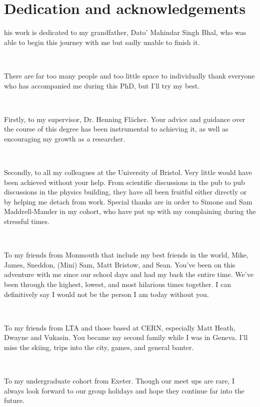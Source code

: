 %
%

\chapter*{Dedication and acknowledgements}
\begin{SingleSpace}
his work is dedicated to my grandfather, Dato' Mahindar Singh Bhal, who was able to begin this journey with me but sadly unable to finish it.

\

There are far too many people and too little space to individually thank everyone who has accompanied me during this PhD, but I'll try my best.

\

Firstly, to my supervisor, Dr. Henning Fl\"{a}cher. Your advice and guidance over the course of this degree has been instrumental to achieving it, as well as encouraging my growth as a researcher.

\

Secondly, to all my colleagues at the University of Bristol. Very little would have been achieved without your help. From scientific discussions in the pub to pub discussions in the physics building, they have all been fruitful either directly or by helping me detach from work. Special thanks are in order to Simone and Sam Maddrell-Mander in my cohort, who have put up with my complaining during the stressful times.

\

To my friends from Monmouth that include my best friends in the world, Mike, James, Sneddon, (Mini) Sam, Matt Bristow, and Sean. You've been on this adventure with me since our school days and had my back the entire time. We've been through the highest, lowest, and most hilarious times together. I can definitively say I would not be the person I am today without you.

\

To my friends from LTA and those based at CERN, especially Matt Heath, Dwayne and Vukasin. You became my second family while I was in Geneva. I'll miss the skiing, trips into the city, games, and general banter.

\

To my undergraduate cohort from Exeter. Though our meet ups are rare, I always look forward to our group holidays and hope they continue far into the future.


\end{SingleSpace}
